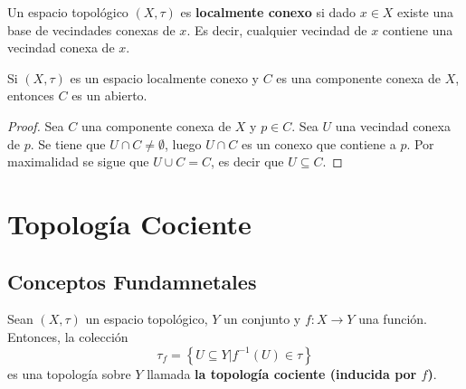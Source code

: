 \documentclass[12pt]{report}
\theoremstyle{largebreak}
\newcommand\cf[3]{\ensuremath{#1:#2\rightarrow#3}}
\begin{document}
    \begin{mydef}
        Un espacio topológico $(X,\tau)$ es \textbf{localmente conexo} si dado $x\in X$ existe una base de vecindades conexas de $x$. Es decir, cualquier vecindad de $x$ contiene una vecindad conexa de $x$.
    \end{mydef}

    \begin{propo}
        Si $(X,\tau)$ es un espacio localmente conexo y $C$ es una componente conexa de $X$, entonces $C$ es un abierto.
    \end{propo}

    \begin{proof}
        Sea $C$ una componente conexa de $X$ y $p\in C$. Sea $U$ una vecindad conexa de $p$. Se tiene que $U\cap C\neq\emptyset$, luego $U\cap C$ es un conexo que contiene a $p$. Por maximalidad se sigue que $U\cup C=C$, es decir que $U\subseteq C$.
    \end{proof}

    \chapter{Topología Cociente}

    \section{Conceptos Fundamnetales}

    \begin{propo}
        Sean $(X,\tau)$ un espacio topológico, $Y$ un conjunto y $\cf{f}{X}{Y}$ una función. Entonces, la colección
        \begin{equation*}
            \tau_f=\left\{U\subseteq Y\Big|f^{-1}(U)\in\tau\right\}
        \end{equation*}
        es una topología sobre $Y$ llamada \textbf{la topología cociente (inducida por $f$)}.
    \end{propo}
\end{document}
